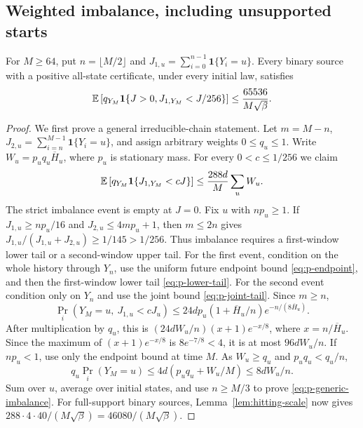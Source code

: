 \subsection{Weighted imbalance, including unsupported starts}

\begin{lemma}\label{lem:imbalance}
For $M\ge64$, put $n=\lfloor M/2\rfloor$ and
$J_{1,u}=\sum_{i=0}^{n-1}\mathbf1\{Y_i=u\}$.
Every binary source with a positive all-state certificate, under every
initial law, satisfies
\[
 \mathbb E\left[q_{Y_M}\mathbf1\{J>0,J_{1,Y_M}<J/256\}\right]
 \le\frac{65536}{M\sqrt\beta}.
\]
\end{lemma}
\begin{proof}
We first prove a general irreducible-chain statement.  Let $m=M-n$,
$J_{2,u}=\sum_{i=n}^{M-1}\mathbf1\{Y_i=u\}$, and assign arbitrary
weights $0\le q_u\le1$.  Write
$W_u=p_uq_u\overline H_u$, where $p_u$ is stationary mass.
For every $0<c\le1/256$ we claim
\begin{equation}\label{eq:p-generic-imbalance}
 \mathbb E\left[q_{Y_M}\mathbf1\{J_{1,Y_M}<cJ\}\right]
 \le\frac{288d}{M}\sum_uW_u.
\end{equation}
The strict imbalance event is empty at $J=0$.
Fix $u$ with $np_u\ge1$.  If
$J_{1,u}\ge np_u/16$ and $J_{2,u}\le4mp_u+1$, then $m\le2n$ gives
$J_{1,u}/(J_{1,u}+J_{2,u})\ge1/145>1/256$.
Thus imbalance requires a first-window lower tail or a second-window
upper tail.  For the first event, condition on the whole history through
$Y_n$, use the uniform future endpoint bound
\eqref{eq:p-endpoint}, and then the first-window lower tail
\eqref{eq:p-lower-tail}.  For the second event condition only on $Y_n$
and use the joint bound \eqref{eq:p-joint-tail}.  Since $m\ge n$,
\[
 \Pr_i(Y_M=u,\ J_{1,u}<cJ_u)
 \le24dp_u(1+\overline H_u/n)e^{-n/(8\overline H_u)}.
\]
After multiplication by $q_u$, this is
$(24dW_u/n)(x+1)e^{-x/8}$, where $x=n/\overline H_u$.
Since the maximum of $(x+1)e^{-x/8}$ is
$8e^{-7/8}<4$, it is at most $96dW_u/n$.
If $np_u<1$, use only the endpoint bound at time $M$.
As $W_u\ge q_u$ and $p_uq_u<q_u/n$,
\[
 q_u\Pr_i(Y_M=u)\le4d(p_uq_u+W_u/M)\le8dW_u/n.
\]
Sum over $u$, average over initial states, and use $n\ge M/3$ to prove
\eqref{eq:p-generic-imbalance}.
For full-support binary sources, Lemma~\ref{lem:hitting-scale} now gives
$288\cdot4\cdot40/(M\sqrt\beta)=46080/(M\sqrt\beta)$.


\end{proof}
